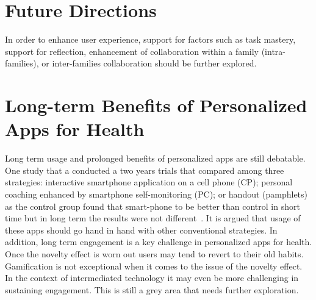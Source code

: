 \section*{Future Directions}
In order to enhance user experience, support for factors such as task mastery, support for reflection, enhancement of collaboration within a family (intra-families), or inter-families collaboration should be further explored.

\section{Long-term Benefits of Personalized Apps for Health} 
Long term usage and prolonged benefits of personalized apps are still debatable. One study that a conducted a two years trials that compared among three strategies: interactive smartphone application on a cell phone (CP); personal coaching enhanced by smartphone self-monitoring (PC); or handout (pamphlets) as the control group found that smart-phone to be better than control in short time but in long term the results were not different~\citep{svetkey2015cell}. It is argued that usage of these apps should go hand in hand with other conventional strategies. In addition,  long  term engagement is a key challenge in personalized apps for health. Once the novelty effect is worn out users may tend to revert to their old habits. Gamification is not exceptional when it comes to the issue of the novelty effect. In the context of intermediated technology it may even be more challenging in sustaining engagement. This is still a grey area that needs further exploration.
 
\begin{flushright}
\end{flushright}
